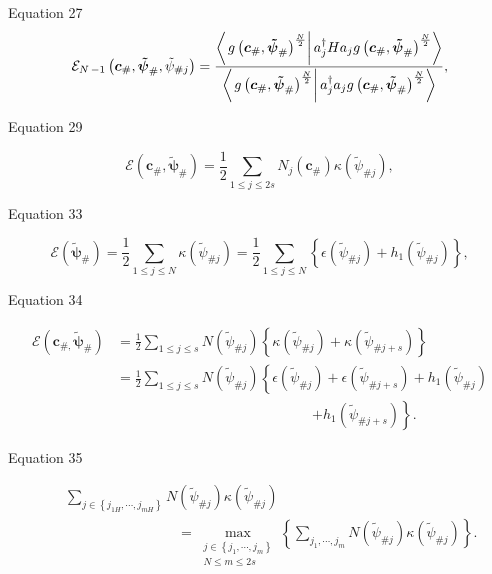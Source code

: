 \documentclass{article}
\begin{document}
Equation 27%
\[
\mathcal{E}_{N\,-1}\left( \boldsymbol{c}_{\#},\boldsymbol{\tilde{\psi}}_{\#},%
\tilde{\psi}_{\#j}\right) =\frac{\left\langle \left. g\left( \boldsymbol{c}%
_{\#},\boldsymbol{\tilde{\psi}}_{\#}\right) ^{\frac{N}{2}}\right\vert
a_{j}^{\dagger }Ha_{j}g\left( \boldsymbol{c}_{\#},\boldsymbol{\tilde{\psi}}%
_{\#}\right) ^{\frac{N}{2}}\right\rangle }{\left\langle \left. g\left( 
\boldsymbol{c}_{\#},\boldsymbol{\tilde{\psi}}_{\#}\right) ^{\frac{N}{2}%
}\right\vert a_{j}^{\dagger }a_{j}g\left( \boldsymbol{c}_{\#},\boldsymbol{%
\tilde{\psi}}_{\#}\right) ^{\frac{N}{2}}\right\rangle },
\]%
\bigskip 

Equation 29

\[
\mathcal{E}\left( \boldsymbol{c}_{\#},\boldsymbol{\tilde{\psi}}_{\#}\right) =%
\frac{1}{2}\sum_{1\leq j\leq 2s}N_{j}\left( \boldsymbol{c}_{\#}\right)
\kappa \left( \tilde{\psi}_{\#j}\right) ,
\]

Equation 33

\[
\mathcal{E}\left( \boldsymbol{\tilde{\psi}}_{\#}\right) =\frac{1}{2}%
\sum_{1\leq j\leq N}\kappa \left( \tilde{\psi}_{\#j}\right) =\frac{1}{2}%
\sum_{1\leq j\leq N}\left\{ \epsilon \left( \tilde{\psi}_{\#j}\right)
+h_{1}\left( \tilde{\psi}_{\#j}\right) \right\} ,
\]

Equation 34

\begin{align*}
\mathcal{E}\left( \boldsymbol{c}_{\#,}\boldsymbol{\tilde{\psi}}_{\#}\right)
& =\frac{1}{2}\sum_{1\leq j\leq s}N\left( \tilde{\psi}_{\#j}\right) \left\{
\kappa \left( \tilde{\psi}_{\#j}\right) +\kappa \left( \tilde{\psi}%
_{\#j+s}\right) \right\}  \\
& =\frac{1}{2}\sum_{1\leq j\leq s}N\left( \tilde{\psi}_{\#j}\right) \left\{
\epsilon \left( \tilde{\psi}_{\#j}\right) +\epsilon \left( \tilde{\psi}%
_{\#j+s}\right) +h_{1}\left( \tilde{\psi}_{\#j}\right) \right.  \\
& \qquad \qquad \qquad \qquad \qquad \qquad \qquad \left. +h_{1}\left( 
\tilde{\psi}_{\#j+s}\right) \right\} .
\end{align*}

Equation 35

\begin{eqnarray*}
&&\sum_{j\in \left\{ j_{1H},\cdots ,j_{mH}\right\} }N\left( \tilde{\psi}%
_{\#j}\right) \kappa \left( \tilde{\psi}_{\#j}\right)  \\
&&\qquad \qquad \qquad \qquad =\max_{\substack{ j\in \left\{ j_{1},\cdots
,j_{m}\right\}  \\ N\leq m\leq 2s}}\left\{ \sum_{j_{1},\cdots ,j_{m}}N\left( 
\tilde{\psi}_{\#j}\right) \kappa \left( \tilde{\psi}_{\#j}\right) \right\} .
\end{eqnarray*}
\end{document}
